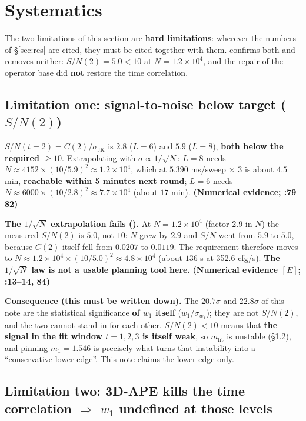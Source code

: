 \documentclass[11pt,a4paper]{article}
\newcommand{\code}[1]{\texttt{\footnotesize\detokenize{#1}}}
\newcommand{\gr}[1]{\textbf{(#1)}}
\begin{document}
\section{Systematics}\label{sec:sys}

The two limitations of this section are \textbf{hard limitations}: wherever the numbers of \S\ref{sec:res} are cited, they must be cited
together with them. \code{run3} confirms both and removes neither: $S/N(2)=5.0<10$ at $N=1.2\times10^4$, and the repair of the operator base
did \textbf{not} restore the time correlation.

\subsection{Limitation one: signal-to-noise below target ($S/N(2)$)}

$S/N(t=2)=C(2)/\sigma_{\text{JK}}$ is $2.8$ ($L=6$) and $5.9$ ($L=8$), \textbf{both below the required $\ge10$}.
Extrapolating with $\sigma\propto1/\sqrt N$: $L=8$ needs $N\approx 4152\times(10/5.9)^2\approx1.2\times10^4$,
which at $5.390$ ms/sweep $\times$ \code{gap} 3 is about $4.5$ min, \textbf{reachable within 5 minutes next round};
$L=6$ needs $N\approx 6000\times(10/2.8)^2\approx7.7\times10^4$ (about $17$ min).
\gr{Numerical evidence; \code{RUN1.md}:79--82}

\textbf{The $1/\sqrt N$ extrapolation fails (\code{run3}).} At $N=1.2\times10^4$ (factor $2.9$ in $N$) the measured
$S/N(2)$ is $5.0$, not $10$: $N$ grew by $2.9$ and $S/N$ went from $5.9$ to $5.0$, because $C(2)$ itself fell from $0.0207$ to $0.0119$.
The requirement therefore moves to $N\approx1.2\times10^4\times(10/5.0)^2\approx4.8\times10^4$ (about $136$ s at 352.6 cfg/s).
\textbf{The $1/\sqrt N$ law is not a usable planning tool here.}
\gr{Numerical evidence $[E]$; \code{RUN3.md}:13--14, 84}

\textbf{Consequence (this must be written down).} The $20.7\sigma$ and $22.8\sigma$ of this note are the statistical significance
\textbf{of $w_1$ itself} ($w_1/\sigma_{w_1}$); they are not $S/N(2)$, and the two cannot stand in for each other. $S/N(2)<10$ means that
\textbf{the signal in the fit window $t=1,2,3$ is itself weak}, so $m_{\text{fit}}$ is unstable (\S\ref{sec:ape}),
and pinning $m_1=1.546$ is precisely what turns that instability into a ``conservative lower edge''. This note claims the lower edge only.

\subsection{Limitation two: 3D-APE kills the time correlation $\Rightarrow$ $w_1$ undefined at those levels}\label{sec:ape}
\end{document}
